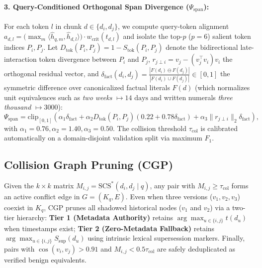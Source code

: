 \documentclass[11pt,a4paper]{article}
\theoremstyle{definition}
\newcommand{\SCS}{\mathrm{SCS}^*}
\begin{document}
\paragraph{3. Query-Conditioned Orthogonal Span Divergence ($\Psi_{\mathrm{span}}$):} For each token $l$ in chunk $d \in \{d_i, d_j\}$, we compute query-token alignment $a_{d,l} = \bigl(\max_m \langle \hat{h}_{q,m}, \hat{h}_{d,l} \rangle\bigr) \cdot w_{\mathrm{crit}}(t_{d,l})$ and isolate the top-$p$ ($p=6$) salient token indices $P_i, P_j$. Let $D_{\mathrm{tok}}(P_i, P_j) = 1 - S_{\mathrm{tok}}(P_i, P_j)$ denote the bidirectional late-interaction token divergence between $P_i$ and $P_j$, $r_{j \perp i} = v_j - (v_j^\top v_i)v_i$ the orthogonal residual vector, and $\delta_{\mathrm{fact}}(d_i, d_j) = \frac{|F(d_i) \ominus F(d_j)|}{|F(d_i) \cup F(d_j)|} \in [0, 1]$ the symmetric difference over canonicalized factual literals $F(d)$ (which normalizes unit equivalences such as \emph{two weeks} $\mapsto 14\text{ days}$ and written numerals \emph{three thousand} $\mapsto 3000$):
\begin{equation}
\Psi_{\mathrm{span}} = \mathrm{clip}_{[0,1]}\!\left(\alpha_1 \delta_{\mathrm{fact}} + \alpha_2 D_{\mathrm{tok}}(P_i, P_j)(0.22 + 0.78 \delta_{\mathrm{fact}}) + \alpha_3 \|r_{j \perp i}\|_2 \delta_{\mathrm{fact}}\right),
\end{equation}
with $\alpha_1 = 0.76, \alpha_2 = 1.40, \alpha_3 = 0.50$. The collision threshold $\tau_{\mathrm{col}}$ is calibrated automatically on a domain-disjoint validation split via maximum $F_1$.

\subsection{Collision Graph Pruning (CGP)}
Given the $k \times k$ matrix $M_{i,j} = \SCS(d_i, d_j \mid q)$, any pair with $M_{i,j} \ge \tau_{\mathrm{col}}$ forms an active conflict edge in $G = (K_q, E)$. Even when three versions ($v_1, v_2, v_3$) coexist in $K_q$, CGP prunes all shadowed historical nodes ($v_1$ and $v_2$) via a two-tier hierarchy: \textbf{Tier 1 (Metadata Authority)} retains $\arg\max_{u \in \{i,j\}} t(d_u)$ when timestamps exist; \textbf{Tier 2 (Zero-Metadata Fallback)} retains $\arg\max_{u \in \{i,j\}} S_{\mathrm{sup}}(d_u)$ using intrinsic lexical supersession markers. Finally, pairs with $\cos(v_i, v_j) > 0.91$ and $M_{i,j} < 0.5\tau_{\mathrm{col}}$ are safely deduplicated as verified benign equivalents.
\end{document}
